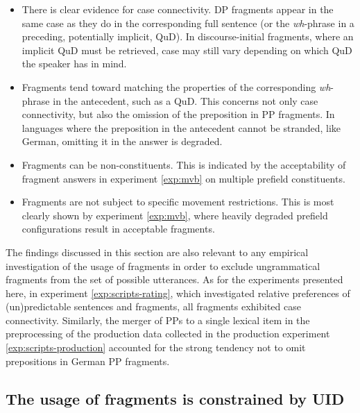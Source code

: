 \begin{itemize}\itemsep0em
 \item There is clear evidence for case connectivity. DP fragments appear in the same case as they do in the corresponding full sentence (or the \textit{wh}-phrase in a preceding, potentially implicit, QuD). In discourse-initial fragments, where an implicit QuD must be retrieved, case may still vary depending on which QuD the speaker has in mind.
 \item Fragments tend toward matching the properties of the corresponding \textit{wh}-phrase in the antecedent, such as a QuD. This concerns not only case connectivity, but also the omission of the preposition in PP fragments. In languages where the preposition in the antecedent cannot be stranded, like German, omitting it in the answer is degraded.
 \item Fragments can be non-constituents. This is indicated by the acceptability of fragment answers in experiment \ref{exp:mvb} on multiple prefield constituents.
 \item Fragments are not subject to specific movement restrictions. This is most clearly shown by experiment \ref{exp:mvb}, where heavily degraded prefield configurations result in acceptable fragments.
\end{itemize}

The findings discussed in this section are also relevant to any empirical investigation of the usage of fragments in order to exclude ungrammatical fragments from the set of possible utterances. As for the experiments presented here, in experiment \ref{exp:scripts-rating}, which investigated relative preferences of (un)predictable sentences and fragments, all fragments exhibited case connectivity. Similarly, the merger of PPs to a single lexical item in the preprocessing of the production data collected in the production experiment \ref{exp:scripts-production} accounted for the strong tendency not to omit prepositions in German PP fragments.

\subsection{The usage of fragments is constrained by UID}

